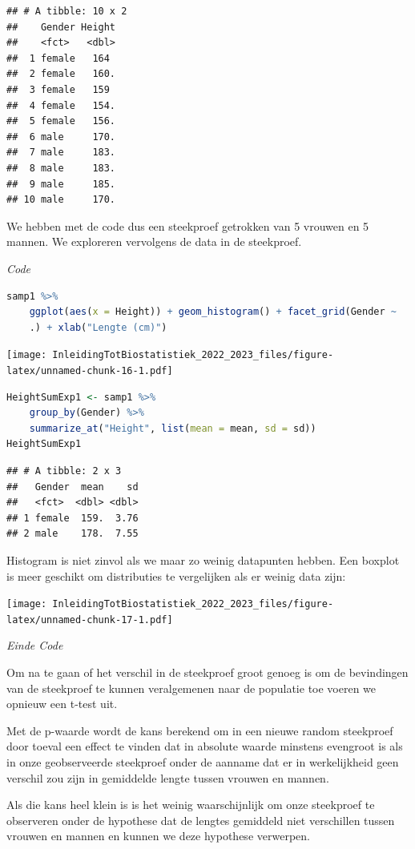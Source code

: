 \documentclass[
  12pt,dutch,coursenotes]{book}
\begin{document}
\begin{lstlisting}
## # A tibble: 10 x 2
##    Gender Height
##    <fct>   <dbl>
##  1 female   164 
##  2 female   160.
##  3 female   159 
##  4 female   154.
##  5 female   156.
##  6 male     170.
##  7 male     183.
##  8 male     183.
##  9 male     185.
## 10 male     170.
\end{lstlisting}

We hebben met de code dus een steekproef getrokken van 5 vrouwen en 5 mannen.
We exploreren vervolgens de data in de steekproef.

\emph{Code}

\begin{lstlisting}[language=R]
samp1 %>%
    ggplot(aes(x = Height)) + geom_histogram() + facet_grid(Gender ~
    .) + xlab("Lengte (cm)")
\end{lstlisting}

\texttt{[image: InleidingTotBiostatistiek\_2022\_2023\_files/figure-latex/unnamed-chunk-16-1.pdf]}

\begin{lstlisting}[language=R]
HeightSumExp1 <- samp1 %>%
    group_by(Gender) %>%
    summarize_at("Height", list(mean = mean, sd = sd))
HeightSumExp1
\end{lstlisting}

\begin{lstlisting}
## # A tibble: 2 x 3
##   Gender  mean    sd
##   <fct>  <dbl> <dbl>
## 1 female  159.  3.76
## 2 male    178.  7.55
\end{lstlisting}

Histogram is niet zinvol als we maar zo weinig datapunten hebben. Een boxplot is meer geschikt om distributies te vergelijken als er weinig data zijn:

\texttt{[image: InleidingTotBiostatistiek\_2022\_2023\_files/figure-latex/unnamed-chunk-17-1.pdf]}

\emph{Einde Code}

Om na te gaan of het verschil in de steekproef groot genoeg is om de bevindingen van de steekproef te kunnen veralgemenen naar de populatie toe voeren we opnieuw een t-test uit.

Met de p-waarde wordt de kans berekend om in een nieuwe random steekproef door toeval een effect te vinden dat in absolute waarde minstens evengroot is als in onze geobserveerde steekproef onder de aanname dat er in werkelijkheid geen verschil zou zijn in gemiddelde lengte tussen vrouwen en mannen.

Als die kans heel klein is is het weinig waarschijnlijk om onze steekproef te observeren onder de hypothese dat de lengtes gemiddeld niet verschillen tussen vrouwen en mannen en kunnen we deze hypothese verwerpen.
\end{document}
